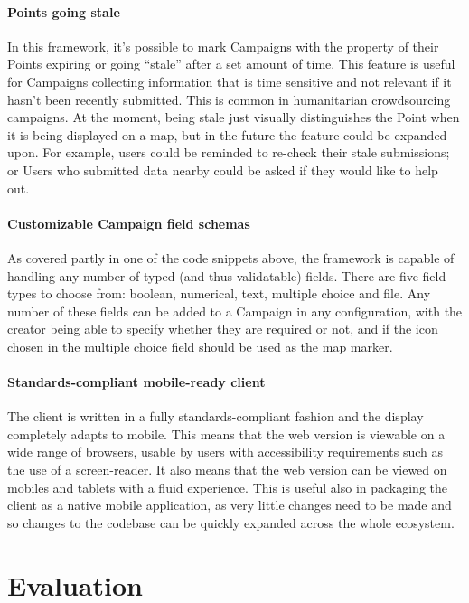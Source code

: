 \documentclass{article}
\let\oldsection\section
\renewcommand\section{\clearpage\oldsection}
\begin{document}
	\paragraph{Points going stale}
	In this framework, it's possible to mark Campaigns with the property of their Points expiring or going ``stale'' after a set amount of time. This feature is useful for Campaigns collecting information that is time sensitive and not relevant if it hasn't been recently submitted. This is common in humanitarian crowdsourcing campaigns. At the moment, being stale just visually distinguishes the Point when it is being displayed on a map, but in the future the feature could be expanded upon. For example, users could be reminded to re-check their stale submissions; or Users who submitted data nearby could be asked if they would like to help out.

	\paragraph{Customizable Campaign field schemas}
	As covered partly in one of the code snippets above, the framework is capable of handling any number of typed (and thus validatable) fields. There are five field types to choose from: boolean, numerical, text, multiple choice and file. Any number of these fields can be added to a Campaign in any configuration, with the creator being able to specify whether they are required or not, and if the icon chosen in the multiple choice field should be used as the map marker.

	\paragraph{Standards-compliant mobile-ready client}
	The client is written in a fully standards-compliant fashion and the display completely adapts to mobile. This means that the web version is viewable on a wide range of browsers, usable by users with accessibility requirements such as the use of a screen-reader. It also means that the web version can be viewed on mobiles and tablets with a fluid experience. This is useful also in packaging the client as a native mobile application, as very little changes need to be made and so changes to the codebase can be quickly expanded across the whole ecosystem.

	\section{Evaluation}
	\label{sec:evaluation}
\end{document}
